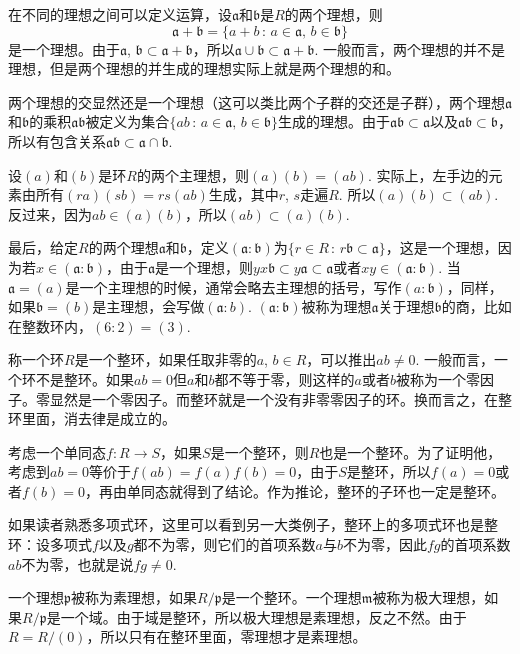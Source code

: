 \para 在不同的理想之间可以定义运算，设$\mathfrak{a}$和$\mathfrak{b}$是$R$的两个理想，则
\[
\mathfrak{a}+\mathfrak{b}=\{a+b\,:\,a\in\mathfrak{a},\,b\in\mathfrak{b}\}
\]
是一个理想。由于$\mathfrak{a}$, $\mathfrak{b}\subset \mathfrak{a}+\mathfrak{b}$，所以$\mathfrak{a}\cup\mathfrak{b}\subset \mathfrak{a}+\mathfrak{b}$. 一般而言，两个理想的并不是理想，但是两个理想的并生成的理想实际上就是两个理想的和。

两个理想的交显然还是一个理想（这可以类比两个子群的交还是子群），两个理想$\mathfrak{a}$和$\mathfrak{b}$的乘积$\mathfrak{a}\mathfrak{b}$被定义为集合$\{ab\,:\,a\in\mathfrak{a},\,b\in\mathfrak{b}\}$生成的理想。由于$\mathfrak{a}\mathfrak{b}\subset \mathfrak{a}$以及$\mathfrak{a}\mathfrak{b}\subset \mathfrak{b}$，所以有包含关系$\mathfrak{a}\mathfrak{b}\subset \mathfrak{a}\cap \mathfrak{b}$.

设$(a)$和$(b)$是环$R$的两个主理想，则$(a)(b)=(ab)$. 实际上，左手边的元素由所有$(ra)(sb)=rs(ab)$生成，其中$r$, $s$走遍$R$. 所以$(a)(b)\subset (ab)$. 反过来，因为$ab\in (a)(b)$，所以$(ab)\subset (a)(b)$.

最后，给定$R$的两个理想$\mathfrak{a}$和$\mathfrak{b}$，定义$(\mathfrak{a}:\mathfrak{b})$为$\{r\in R\,:\, r\mathfrak{b}\subset \mathfrak{a}\}$，这是一个理想，因为若$x\in (\mathfrak{a}:\mathfrak{b})$，由于$\mathfrak{a}$是一个理想，则$yx\mathfrak{b}\subset y\mathfrak{a}\subset \mathfrak{a}$或者$xy\in (\mathfrak{a}:\mathfrak{b})$. 当$\mathfrak{a}=(a)$是一个主理想的时候，通常会略去主理想的括号，写作$(a:\mathfrak{b})$，同样，如果$\mathfrak{b}=(b)$是主理想，会写做$(\mathfrak{a}:b)$. $(\mathfrak{a}:\mathfrak{b})$被称为理想$\mathfrak{a}$关于理想$\mathfrak{b}$的商，比如在整数环内，$(6:2)=(3)$.

\para 称一个环$R$是一个整环，如果任取非零的$a$, $b\in R$，可以推出$ab\neq 0$. 一般而言，一个环不是整环。如果$ab=0$但$a$和$b$都不等于零，则这样的$a$或者$b$被称为一个零因子。零显然是一个零因子。而整环就是一个没有非零零因子的环。换而言之，在整环里面，消去律是成立的。

考虑一个单同态$f:R\to S$，如果$S$是一个整环，则$R$也是一个整环。为了证明他，考虑到$ab=0$等价于$f(ab)=f(a)f(b)=0$，由于$S$是整环，所以$f(a)=0$或者$f(b)=0$，再由单同态就得到了结论。作为推论，整环的子环也一定是整环。

如果读者熟悉多项式环，这里可以看到另一大类例子，整环上的多项式环也是整环：设多项式$f$以及$g$都不为零，则它们的首项系数$a$与$b$不为零，因此$fg$的首项系数$ab$不为零，也就是说$fg\neq 0$.

\para 一个理想$\mathfrak{p}$被称为素理想，如果$R/\mathfrak{p}$是一个整环。一个理想$\mathfrak{m}$被称为极大理想，如果$R/\mathfrak{p}$是一个域。由于域是整环，所以极大理想是素理想，反之不然。由于$R=R/(0)$，所以只有在整环里面，零理想才是素理想。


